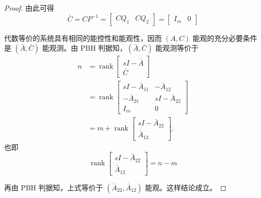 \begin{lemma}
\begin{proof}
    由此可得
    \[
    \bar{C}
    =
    CP^{-1}
    =
    \begin{bmatrix}
    CQ_1 & CQ_2
    \end{bmatrix}
    =
    \begin{bmatrix}
    I_m & 0
    \end{bmatrix}
    \]

    代数等价的系统具有相同的能控性和能观性，因而 $(A,C)$ 能观的充分必要条件是
    $(\bar{A},\bar{C})$ 能观测。由 PBH 判据知，$(\bar{A},\bar{C})$ 能观测等价于
    \[
    \begin{aligned}
    n
    &=
    \operatorname{rank}
    \begin{bmatrix}
    sI-\bar{A}\\
    \bar{C}
    \end{bmatrix} \\
    &=
    \operatorname{rank}
    \begin{bmatrix}
    sI-\bar{A}_{11} & -\bar{A}_{12}\\
    -\bar{A}_{21} & sI-\bar{A}_{22}\\
    I_m & 0
    \end{bmatrix} \\
    &=
    m+
    \operatorname{rank}
    \begin{bmatrix}
    sI-\bar{A}_{22}\\
    \bar{A}_{12}
    \end{bmatrix}.
    \end{aligned}
    \]
    也即
    \[
    \operatorname{rank}
    \begin{bmatrix}
    sI-\bar{A}_{22}\\
    \bar{A}_{12}
    \end{bmatrix}
    =
    n-m
    \]

    再由 PBH 判据知，上式等价于 $(\bar{A}_{22},\bar{A}_{12})$ 能观。这样结论成立。
    \end{proof}
\end{lemma}

